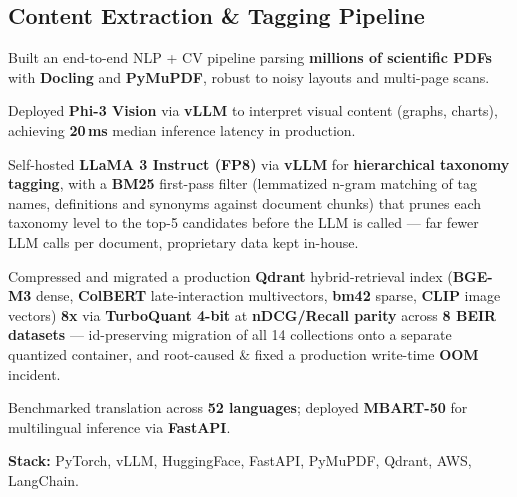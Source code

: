 \documentclass[letter,10pt]{article}
\begin{document}
\subsection{Content Extraction \& Tagging Pipeline}
\begin{zitemize}
\item Built an end-to-end NLP + CV pipeline parsing \textbf{millions of scientific PDFs} with \textbf{Docling} and \textbf{PyMuPDF}, robust to noisy layouts and multi-page scans.
\item Deployed \textbf{Phi-3 Vision} via \textbf{vLLM} to interpret visual content (graphs, charts), achieving \textbf{20\,ms} median inference latency in production.
\item Self-hosted \textbf{LLaMA 3 Instruct (FP8)} via \textbf{vLLM} for \textbf{hierarchical taxonomy tagging}, with a \textbf{BM25} first-pass filter (lemmatized n-gram matching of tag names, definitions and synonyms against document chunks) that prunes each taxonomy level to the top-5 candidates before the LLM is called --- far fewer LLM calls per document, proprietary data kept in-house.
\item Compressed and migrated a production \textbf{Qdrant} hybrid-retrieval index (\textbf{BGE-M3} dense, \textbf{ColBERT} late-interaction multivectors, \textbf{bm42} sparse, \textbf{CLIP} image vectors) \textbf{8x} via \textbf{TurboQuant 4-bit} at \textbf{nDCG/Recall parity} across \textbf{8 BEIR datasets} --- id-preserving migration of all 14 collections onto a separate quantized container, and root-caused \& fixed a production write-time \textbf{OOM} incident.
\item Benchmarked translation across \textbf{52 languages}; deployed \textbf{MBART-50} for multilingual inference via \textbf{FastAPI}.
\item \textbf{Stack:} PyTorch, vLLM, HuggingFace, FastAPI, PyMuPDF, Qdrant, AWS, LangChain.
\end{zitemize}

\end{document}
